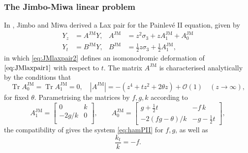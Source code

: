\documentclass[a4paper,reqno]{amsart}
\numberwithin{equation}{section}
\numberwithin{equation}{section}
\begin{document}
\subsubsection{The Jimbo-Miwa linear problem}
In \cite{jimbomiwaII1981}, Jimbo and Miwa derived a Lax pair for the Painlev\'e II equation, given by
\begin{subequations} \label{eq:JMlaxpair}
    \begin{align}
    Y_z&=A^{\text{JM}}Y, & A^{\text{JM}}&=z^2\sigma_3+zA_1^{\text{JM}}+A_0^{\text{JM}} \label{eq:JMlaxpair1}\\
    Y_t&=B^{\text{JM}}Y, & B^{\text{JM}}&=\tfrac{1}{2}z\sigma_3+ \tfrac{1}{2}A_1^{\text{JM}}, \label{eq:JMlaxpair2}
\end{align}
\end{subequations}
in which \eqref{eq:JMlaxpair2} defines an isomonodromic deformation of $\eqref{eq:JMlaxpair1}$ with respect to $t$.
The matrix $A^{\text{JM}}$ is characterised analytically by the conditions that
\begin{equation*}
    \operatorname{Tr}A_0^{\text{JM}}= \operatorname{Tr}A_1^{\text{JM}}=0,\quad |A^{\text{JM}}|=- \left( z^4+tz^2+2\theta z\right)+\mathcal{O}(1)\quad (z\rightarrow \infty),
\end{equation*}
for fixed $\theta$.
Parametrising the matrices by $f,g,k$ according to 
\begin{equation*}
A_1^{\text{JM}}=\begin{bmatrix}
    0 & k\\
    -2 g/k & 0\\
\end{bmatrix},\qquad
A_0^{\text{JM}}=\begin{bmatrix}
    g+\frac{1}{2}t &-f\,k\\
    -2(f g - \theta)/k & -g-\frac{1}{2}t
\end{bmatrix},
\end{equation*}
the compatibility of gives the system \eqref{eq:hamPII} for $f,g$, as well as
\begin{equation*}
    \frac{k_t}{k}=-f.
\end{equation*}
\end{document}
